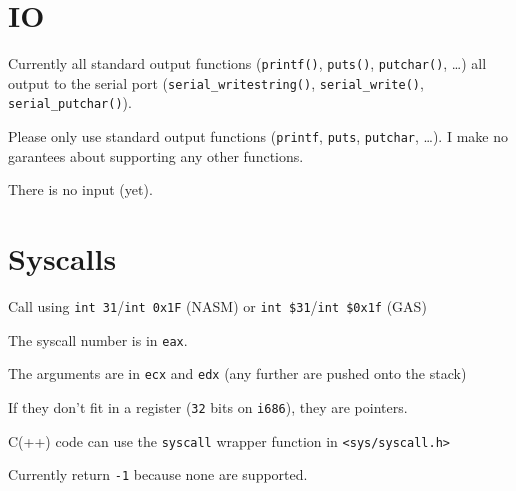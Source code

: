\documentclass[12pt]{article}
\newcommand{\code}[1]{\colorbox{light-gray}{\texttt{#1}}}
\begin{document}
\section{IO}
\begin{list}{}{}
\item Currently all standard output functions (\code{printf()}, \code{puts()}, \code{putchar()}, \ldots) all output to the serial port (\code{serial\_writestring()}, \code{serial\_write()}, \code{serial\_putchar()}).\linebreak
\begin{list}{}{}
\item Please only use standard output functions (\code{printf}, \code{puts}, \code{putchar}, \ldots). I make no garantees about supporting any other functions.
\end{list}
\item There is no input (yet).
\end{list}

\section{Syscalls}
\begin{list}{}{}
\item Call using \code{int 31}/\code{int 0x1F} (NASM) or \code{int \$31}/\code{int \$0x1f} (GAS)
\item The syscall number is in \code{eax}.
\item The arguments are in \code{ecx} and \code{edx} (any further are pushed onto the stack)
\item If they don't fit in a register (\code{32} bits on \code{i686}), they are pointers.
\item C(++) code can use the \code{syscall} wrapper function in \code{<sys/syscall.h>}
\item Currently return \code{-1} because none are supported.
\end{list}
\end{document}
